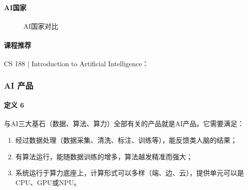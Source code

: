 \documentclass[letterpaper,11pt,english]{sphinxmanual}
\begin{document}
\paragraph{AI国家}
\label{\detokenize{chapter_introduction/AI:id30}}
\begin{figure}[H]
\centering
\capstart

\noindent{}
\caption{AI国家对比\sphinxfootnotemark[202]}\label{\detokenize{chapter_introduction/AI:id41}}\end{figure}
%
\begin{footnotetext}[202]\sphinxAtStartFootnote
{}
%
\end{footnotetext}\ignorespaces 

\paragraph{课程推荐}
\label{\detokenize{chapter_introduction/AI:id31}}
CS 188 | Introduction to Artificial
Intelligence：



\subsubsection{AI 产品}
\label{\detokenize{chapter_introduction/AI_Product:ai}}\label{\detokenize{chapter_introduction/AI_Product::doc}}

\paragraph{定义 6\sphinxfootnotemark[203]}
\label{\detokenize{chapter_introduction/AI_Product:id1}}%
\begin{footnotetext}[203]\sphinxAtStartFootnote
{}
%
\end{footnotetext}\ignorespaces 
与AI三大基石（数据、算法、算力）全部有关的产品就是AI产品。它需要满足：
\begin{enumerate}
%
\item {} 
经过数据处理（数据采集、清洗、标注、训练等），能反馈类人脑的结果；

\item {} 
有算法运行，能随数据训练的增多，算法越发精准而强大；

\item {} 
系统运行于算力底座上，计算形式可以多样（端、边、云），提供单元可以是CPU、GPU或NPU。

\end{enumerate}
\end{document}
